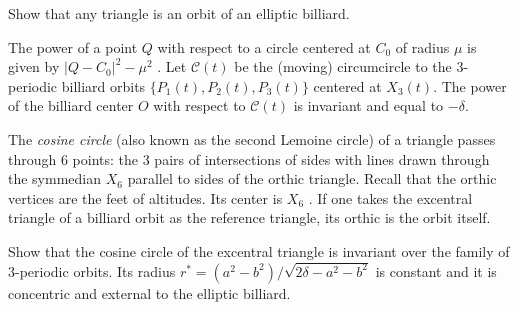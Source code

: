 

\begin{exercise}\label{ex:31} 
Show that any triangle is an orbit of an elliptic billiard. 
\end{exercise}
 
 
 \begin{exercise}\label{ex:32} 
 The power of a point $Q$ with respect to a circle centered at $C_0$ of radius $\mu$ is given by $|Q-C_0|^2-\mu^2$ \cite[Circle Power]{mw}. Let $\mathcal{C}(t)$ be the (moving) circumcircle to the 3-periodic billiard orbits $\{P_1(t),P_2(t),P_3(t)\}$ centered at  $X_3(t)$.
 The power of the billiard center $O$ with respect to $\mathcal{C}(t)$ is invariant and equal to $-\delta$.
\end{exercise}

\begin{exercise}\label{ex:33} 
The {\em cosine circle} (also known as the second Lemoine circle) \cite[Cosine Circle]{mw} of a triangle passes through 6 points: the 3 pairs of intersections of sides with lines drawn through the symmedian $X_6$ parallel to sides of the orthic triangle. Recall that the orthic vertices are the feet of altitudes. Its center is $X_6$ \cite[Cosine Circle]{mw}. If one takes the excentral triangle of a billiard orbit as the reference triangle,   its orthic is the orbit itself.

Show that the cosine circle of the excentral triangle is invariant over the family of 3-periodic orbits. Its radius $r^*=(a^2-b^2)/\sqrt{2\delta-a^2-b^2}$ is constant and it is concentric and external to the elliptic billiard.
\end{exercise}
